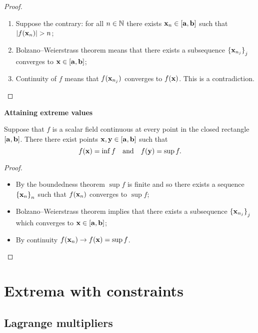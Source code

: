 \begin{proof}
    \begin{enumerate}
        \item Suppose the contrary: for all \(n\in\mathbb{N}\) there exists \(\mathbf{x}_n\in [\mathbf{a},\mathbf{b}]\) such that \(\abs{f(\xx_n)}>n\);
        \item Bolzano–Weierstrass theorem means that there exists a subsequence \({\{\mathbf{x}_{n_j}\}}_{j}\) converges to \( \mathbf{x} \in [\mathbf{a},\mathbf{b}]\);
        \item Continuity of \(f\) means that \(f(\mathbf{x}_{n_j})\) converges to \(f(\mathbf{x})\). This is a contradiction.
    \end{enumerate}



\end{proof}




\textbf{Attaining extreme values}

\begin{theorem}
    Suppose that \(f\) is a scalar field continuous at every point in the closed rectangle \([\mathbf{a},\mathbf{b}]\).
    There there exist points \( \mathbf{x}, \mathbf{y} \in [\mathbf{a},\mathbf{b}]\) such that
    \[
        f(\mathbf{x}) = \inf f
        \quad \text{and} \quad
        f(\mathbf{y})= \sup f.
    \]
\end{theorem}

\begin{proof}
    \begin{itemize}
        \item  By the boundedness theorem \(\sup f\) is finite and so there exists a sequence  \({\{\mathbf{x}_{n}\}}_{n}\)  such that \(f(\mathbf{x}_n)\) converges to \(\sup f\);
        \item Bolzano–Weierstrass theorem implies that there exists a subsequence  \({\{\mathbf{x}_{n_j}\}}_{j}\) which converges to \( \mathbf{x} \in [\mathbf{a},\mathbf{b}]\);
        \item By continuity \(f(\mathbf{x}_n) \to f(\mathbf{x}) = \sup f\).
    \end{itemize}
\end{proof}




\section{Extrema with constraints}

\subsection{Lagrange multipliers}




